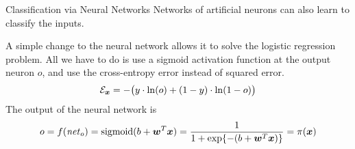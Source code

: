 \begin{frame}{Classification via Neural Networks}
Networks of artificial neurons can also learn to classify the inputs.

\medskip

%
A simple change to the neural network %
allows it to solve the
logistic regression problem. All we have to do is use a sigmoid
activation function at the output neuron $o$, and use the cross-entropy
error instead of squared error. 
\begin{align*}
    {\mathcal E}_{\boldsymbol x} = - \bigl( y \cdot
        \ln(o) + (1-y) \cdot \ln(1-o) \bigr) 
\end{align*}
The output of the neural network is %
$$o = f(\mathit{net}_o) = \text{sigmoid}(b + {\boldsymbol w}^T{\boldsymbol x}) = 
\frac{1}{1 + \exp\{ -(b + {\boldsymbol w}^T{\boldsymbol x}) \}} = \pi({\boldsymbol x})$$
\end{frame}
%
